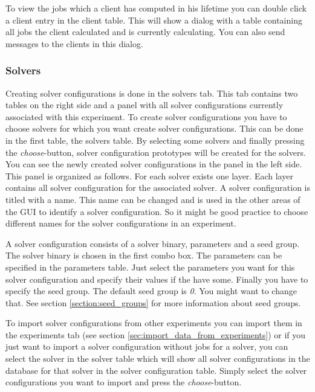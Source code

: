 To view the jobs which a client has computed in his lifetime you can double click a client entry in the client table. This will show a dialog with a table containing all jobs the client calculated and is currently calculating. You can also send messages to the clients in this dialog.
\subsubsection{Solvers}
Creating solver configurations is done in the solvers tab. This tab contains two tables on the right side and a panel with all solver configurations currently associated with this experiment.
To create solver configurations you have to choose solvers for which you want create solver configurations. This can be done in the first table, the solvers table. By selecting some solvers and finally pressing the \textit{choose}-button, solver configuration prototypes will be created for the solvers. You can see the newly created solver configurations in the panel in the left side. This panel is organized as follows. For each solver exists one layer. Each layer contains all solver configuration for the associated solver. A solver configuration is titled with a name. This name can be changed and is used in the other areas of the GUI to identify a solver configuration. So it might be good practice to choose different names for the solver configurations in an experiment.

A solver configuration consists of a solver binary, parameters and a seed group. The solver binary is chosen in the first combo box. The parameters can be specified in the parameters table. Just select the parameters you want for this solver configuration and specify their values if the have some. Finally you have to specify the seed group. The default seed group is \textit{0}. You might want to change that. See section \ref{section:seed_groups} for more information about seed groups.

To import solver configurations from other experiments you can import them in the experiments tab (see section \ref{sec:import_data_from_experiments}) or if you just want to import a solver configuration without jobs for a solver, you can select the solver in the solver table which will show all solver configurations in the database for that solver in the solver configuration table. Simply select the solver configurations you want to import and press the \textit{choose}-button.

